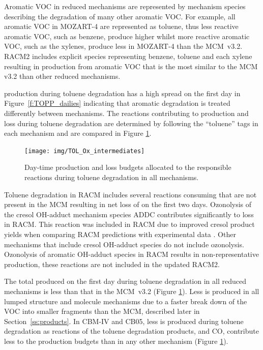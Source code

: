 Aromatic VOC in reduced mechanisms are represented by mechanism species describing the degradation of many other aromatic VOC.
For example, all aromatic VOC in MOZART-4 are represented as toluene, thus less reactive aromatic VOC, such as benzene, produce higher  whilst more reactive aromatic VOC, such as the xylenes, produce less  in MOZART-4 than the \mbox{MCM v3.2}.
RACM2 includes explicit species representing benzene, toluene and each xylene resulting in  production from aromatic VOC that is the most similar to the MCM v3.2 than other reduced mechanisms.

 production during toluene degradation has a high spread on the first day in \mbox{Figure \ref{f:TOPP_dailies}} indicating that aromatic degradation is treated differently between mechanisms.
The reactions contributing to  production and loss during toluene degradation are determined by following the ``toluene'' tags in each mechanism and are compared in Figure \ref{f:toluene_Ox}.

%
\begin{figure}
    \centering
    \texttt{[image: img/TOL\_Ox\_intermediates]}
    \vspace{0mm}
    \caption{Day-time  production and loss budgets allocated to the responsible reactions during toluene degradation in all mechanisms.}
    \vspace{-4mm}
    \label{f:toluene_Ox}
\end{figure}
%
Toluene degradation in RACM includes several reactions consuming  that are not present in the MCM resulting in net loss of  on the first two days.
Ozonolysis of the cresol OH-adduct mechanism species ADDC contributes significantly to  loss in RACM.
This reaction was included in RACM due to improved cresol product yields when comparing RACM predictions with experimental data \citep{Stockwell:1997}. 
Other mechanisms that include cresol OH-adduct species do not include ozonolysis.
Ozonolysis of aromatic OH-adduct species in RACM results in non-representative  production, these reactions are not included in the updated RACM2.

The total  produced on the first day during toluene degradation in all reduced mechanisms is less than that in the \mbox{MCM v3.2} (Figure \ref{f:toluene_Ox}).
Less  is produced in all lumped structure and molecule mechanisms due to a faster break down of the VOC into smaller fragments than the MCM, described later in \mbox{Section \ref{ss:products}}.
In CBM-IV and CB05, less  is produced during toluene degradation as reactions of the toluene degradation products,  and CO, contribute less to the  production budgets than in any other mechanism (Figure \ref{f:toluene_Ox}).

